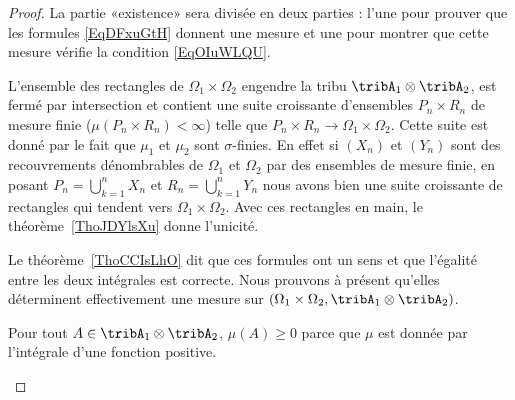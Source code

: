 \begin{proof}
	La partie «existence» sera divisée en deux parties : l'une pour prouver que les formules \eqref{EqDFxuGtH} donnent une mesure et une pour montrer que cette mesure vérifie la condition \eqref{EqOIuWLQU}.
	\begin{subproof}
		\spitem[Unicité]

		L'ensemble des rectangles de \( \Omega_1\times \Omega_2\) engendre la tribu \( \tribA_1\otimes\tribA_2\), est fermé par intersection et contient une suite croissante d'ensembles \( P_n\times R_n\) de mesure finie (\( \mu(P_n\times R_n)<\infty\)) telle que \( P_n\times R_n\to \Omega_1\times \Omega_2\). Cette suite est donné par le fait que \( \mu_1\) et \( \mu_2\) sont \( \sigma\)-finies. En effet si \( (X_n)\) et \( (Y_n)\) sont des recouvrements dénombrables de \( \Omega_1\) et \( \Omega_2\) par des ensembles de mesure finie, en posant \( P_n=\bigcup_{k=1}^nX_n\) et \( R_n=\bigcup_{k=1}^nY_n\) nous avons bien une suite croissante de rectangles qui tendent vers \( \Omega_1\times \Omega_2\). Avec ces rectangles en main, le théorème~\ref{ThoJDYlsXu} donne l'unicité.

		Le théorème~\ref{ThoCCIsLhO} dit que ces formules ont un sens et que l'égalité entre les deux intégrales est correcte. Nous prouvons à présent qu'elles déterminent effectivement une mesure sur \( (\Omega_1\times\Omega_2,\tribA_1\otimes \tribA_2)\).

		Pour tout \( A\in \tribA_1\otimes \tribA_2\), \( \mu(A)\geq 0\) parce que \( \mu\) est donnée par l'intégrale d'une fonction positive.


\end{subproof}
\end{proof}
